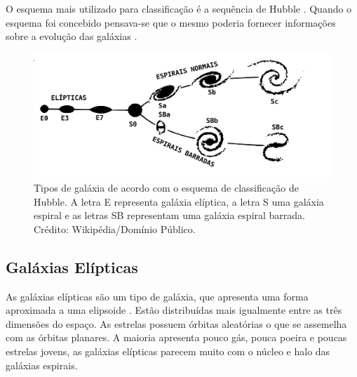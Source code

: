 O esquema mais utilizado para classificação é a sequência de Hubble \cite{bergh1998galaxy}. Quando o esquema foi concebido pensava-se que o mesmo poderia fornecer informações sobre a evolução das galáxias \cite{1926CMWCI.324....1H}. 

\begin{figure}[ht!] 
\centering 
\includegraphics[width=15cm]{imagens/The-Hubble-tuning-fork-diagram.png} 
\caption{Tipos de galáxia de acordo com o esquema de classificação de Hubble. A letra E representa galáxia elíptica, a letra S uma galáxia espiral e as letras SB representam uma galáxia espiral barrada. Crédito: Wikipédia/Domínio Público.} 
\label{fig:ClassificaçãodeHubble} 
\end{figure} 

\subsection{Galáxias Elípticas} 

As galáxias elípticas são um tipo de galáxia, que apresenta uma forma aproximada a uma elipsoide \cite{extragalatic}. Estão distribuídas mais igualmente entre as três dimensões do espaço. As estrelas possuem órbitas aleatórias o que se assemelha com as órbitas planares. A maioria apresenta pouco gás, pouca poeira e poucas estrelas jovens, as galáxias elípticas parecem muito com o núcleo e halo das galáxias espirais. 

